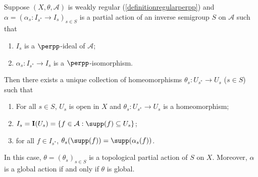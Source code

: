 \begin{theorem}\label{theoremperpppartialactions}
Suppose $(X,\theta,\mathcal{A})$ is weakly regular (\ref{definitionregularperpp}) and $\alpha=(\alpha_s:I_{s^*}\to I_s)_{s\in S}$ is a partial action of an inverse semigroup $S$ on $\mathcal{A}$ such that
\begin{enumerate}
\item[(i)] $I_s$ is a $\perpp$-ideal of $\mathcal{A}$;
\item[(ii)] $\alpha_s:I_{s^*}\to I_s$ is a $\perpp$-isomorphism.
\end{enumerate}
Then there exists a unique collection of homeomorphisms $\theta_s:U_{s^*}\to U_s$ ($s\in S$) such that
\begin{enumerate}
\item[(1)] For all $s\in S$, $U_s$ is open in $X$ and $\theta_s:U_{s^*}\to U_s$ is a homeomorphism;
\item[(2)] $I_s=\mathbf{I}(U_s)=\left\{f\in\mathcal{A}:\supp(f)\subseteq U_s\right\}$;
\item[(3)] for all $f\in I_{s^*}$, $\theta_s(\supp(f))=\supp(\alpha_s(f))$.
\end{enumerate}
In this case, $\theta=\left(\theta_s\right)_{s\in S}$ is a topological partial action of $S$ on $X$. Moreover, $\alpha$ is a global action if and only if $\theta$ is global.
\end{theorem}
